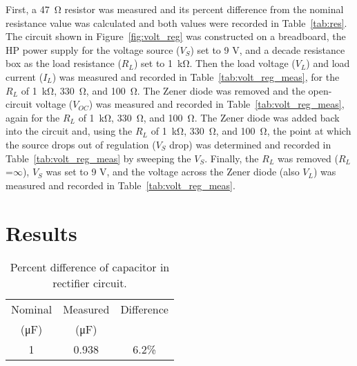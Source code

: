 \documentclass{article}
\begin{document}
First, a \SI{47}{\ohm} resistor was measured and its percent difference from the nominal resistance value was calculated and both values were recorded in Table~\ref{tab:res}.  The circuit shown in Figure~\ref{fig:volt_reg} was constructed on a breadboard, the HP power supply for the voltage source ($V_S$) set to 9 V, and a decade resistance box as the load resistance ($R_L$) set to \SI{1}{\kilo\ohm}.  Then the load voltage ($V_L$) and load current ($I_L$) was measured and recorded in Table~\ref{tab:volt_reg_meas}, for the $R_L$ of \SI{1}{\kilo\ohm}, \SI{330}{\ohm}, and \SI{100}{\ohm}.  The Zener diode was removed and the open-circuit voltage ($V_{OC}$) was measured and recorded in Table~\ref{tab:volt_reg_meas}, again for the $R_L$ of \SI{1}{\kilo\ohm}, \SI{330}{\ohm}, and \SI{100}{\ohm}.  The Zener diode was added back into the circuit and, using the $R_L$ of \SI{1}{\kilo\ohm}, \SI{330}{\ohm}, and \SI{100}{\ohm}, the point at which the source drops out of regulation ($V_S$ drop) was determined and recorded in Table~\ref{tab:volt_reg_meas} by sweeping the $V_S$.  Finally, the $R_L$ was removed ($R_L$=$\infty$), $V_S$ was set to 9 V, and the voltage across the Zener diode (also $V_L$) was measured and recorded in Table~\ref{tab:volt_reg_meas}.

\section{Results}
\label{sec:results}

\begin{table}[hbtp]
  \centering
  \begin{tabular}{ccc}
    Nominal             & Measured            & Difference \\
    (\si{\micro\farad}) & (\si{\micro\farad}) &            \\
    \hline
    1                   & 0.938               & 6.2\%      \\
  \end{tabular}
  \caption{\label{tab:cap} Percent difference of capacitor in rectifier circuit.}
\end{table}
\end{document}

